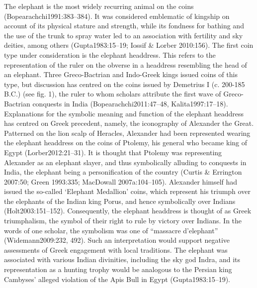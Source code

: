 \documentclass{ijsra}
\begin{document}
The elephant is the most widely recurring animal on the coins (Bopearachchi1991:383–384).
It was considered emblematic of kingship on account of its physical stature and strength,
while its fondness for bathing and the use of the trunk to spray water led to an association with fertility and sky deities,
among others (Gupta1983:15–19; Iossif & Lorber 2010:156).
The first coin type under consideration is the elephant headdress.
This refers to the representation of the ruler on the obverse in a headdress resembling the head of an elephant.
Three Greco-Bactrian and Indo-Greek kings issued coins of this type, but discussion has centred on the coins issued by Demetrius I
(c. 200-185 B.C.) (see fig. 1), the ruler to whom scholars attribute the first wave of Greco-Bactrian conquests in India
(Bopearachchi2011:47–48, Kalita1997:17–18).
Explanations for the symbolic meaning and function of the elephant headdress has centred on Greek precedent,
namely, the iconography of Alexander the Great.
Patterned on the lion scalp of Heracles, Alexander had been represented wearing the elephant headdress on the coins of Ptolemy,
his general who became king of Egypt (Lorber2012:21–31).
It is thought that Ptolemy was representing Alexander as an elephant slayer, and thus symbolically alluding to conquests in India,
the elephant being a personification of the country (Curtis & Errington 2007:50; Green 1993:335; MacDowall 2007a:104–105).
Alexander himself had issued the so-called ‘Elephant Medallion’ coins, which represent his triumph over the elephants of the Indian
king Porus, and hence symbolically over Indians (Holt2003:151–152).
Consequently, the elephant headdress is thought of as Greek triumphalism, the symbol of their right to rule by victory over Indians.
In the words of one scholar, the symbolism was one of “massacre d’elephant” (Widemann2009:232, 492).
Such an interpretation would support negative assessments of Greek engagement with local traditions.
The elephant was associated with various Indian divinities, including the sky god Indra, and its representation as a hunting trophy
would be analogous to the Persian king Cambyses’ alleged violation of the Apis Bull in Egypt (Gupta1983:15–19).
\end{document}
